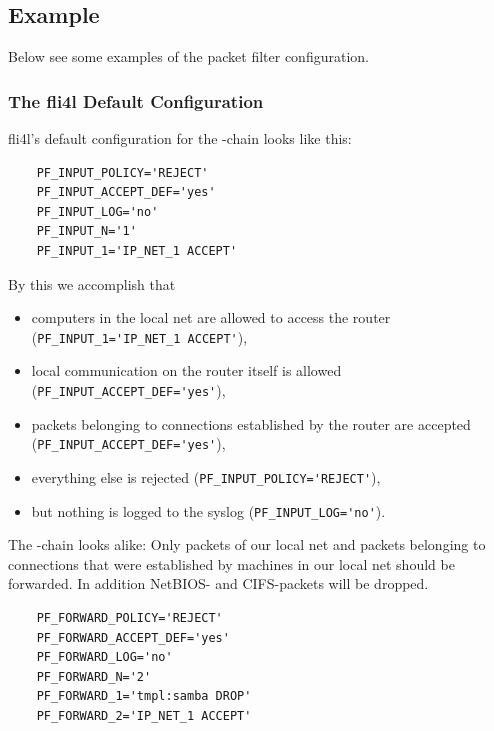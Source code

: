 \subsection{Example}

Below see some examples of the packet filter configuration.

\subsubsection{The fli4l Default Configuration}

fli4l's default configuration for the
-chain looks like this:

\begin{example}
\begin{verbatim}
    PF_INPUT_POLICY='REJECT'
    PF_INPUT_ACCEPT_DEF='yes'
    PF_INPUT_LOG='no'
    PF_INPUT_N='1'
    PF_INPUT_1='IP_NET_1 ACCEPT'
\end{verbatim}
\end{example}

By this we accomplish that
\begin{itemize}
\item computers in the local net are allowed to access the router\\
(\verb+PF_INPUT_1='IP_NET_1 ACCEPT'+),
\item local communication on the router itself is allowed
  (\verb+PF_INPUT_ACCEPT_DEF='yes'+),
\item packets belonging to connections established by the router are accepted
  \newline (\verb+PF_INPUT_ACCEPT_DEF='yes'+),
\item everything else is rejected (\verb+PF_INPUT_POLICY='REJECT'+),
\item but nothing is logged to the syslog
  (\verb+PF_INPUT_LOG='no'+).
\end{itemize}

The -chain looks alike: Only packets of our local
net and packets belonging to connections that were established by
machines in our local net should be forwarded. In addition NetBIOS-
and CIFS-packets will be dropped.

\begin{example}
\begin{verbatim}
    PF_FORWARD_POLICY='REJECT'
    PF_FORWARD_ACCEPT_DEF='yes'
    PF_FORWARD_LOG='no'
    PF_FORWARD_N='2'
    PF_FORWARD_1='tmpl:samba DROP'
    PF_FORWARD_2='IP_NET_1 ACCEPT'
\end{verbatim}
\end{example}

